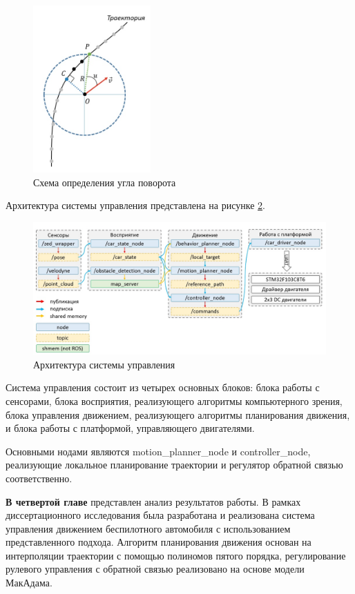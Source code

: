 \begin{figure}[h]
	\centering
	\includegraphics[width=0.4\textwidth]{images/path_moving}
	\caption{Схема определения угла поворота}
	\label{img:path_moving}
\end{figure}


Архитектура системы управления представлена на рисунке \ref{img:ros_arch}.

\begin{figure}[h]
    \centering
    \includegraphics[width=\textwidth]{images/ros_arch}
    \caption{Архитектура системы управления}
    \label{img:ros_arch}
\end{figure}

Система управления состоит из четырех основных блоков: блока работы с сенсорами, блока восприятия,
реализующего алгоритмы компьютерного зрения, блока управления движением, реализующего алгоритмы
планирования движения, и блока работы с платформой, управляющего двигателями.

Основными нодами являются motion\_planner\_node и controller\_node, реализующие локальное планирование
траектории и регулятор обратной связью соответственно.

\textbf{В четвертой главе} представлен анализ результатов работы. В рамках диссертационного исследования
была разработана и реализована система управления движением беспилотного автомобиля с использованием
представленного подхода. Алгоритм планирования движения основан на интерполяции траектории с помощью
полиномов пятого порядка, регулирование рулевого управления с обратной связью реализовано на основе
модели МакАдама.


